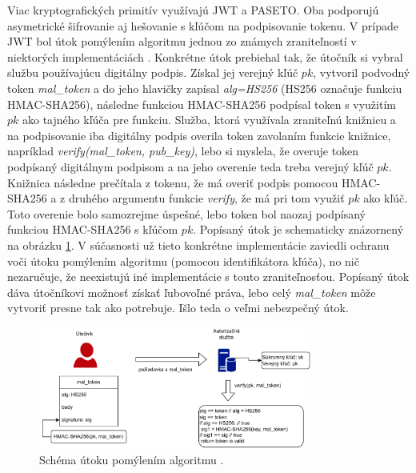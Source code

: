 Viac kryptografických primitív využívajú JWT a PASETO. Oba podporujú asymetrické šifrovanie aj hešovanie s kľúčom na podpisovanie tokenu. V prípade JWT bol útok pomýlením algoritmu jednou zo známych zraniteľností v niektorých implementáciách \cite{jwt_vul}. Konkrétne útok prebiehal tak, že útočník si vybral službu používajúcu digitálny podpis. Získal jej verejný kľúč $pk$, vytvoril podvodný token \textit{mal\_token} a do jeho hlavičky zapísal \textit{alg=HS256} (HS256 označuje funkciu HMAC-SHA256), následne funkciou HMAC-SHA256 podpísal token s využitím $pk$ ako tajného kľúča pre funkciu. Služba, ktorá využívala zraniteľnú knižnicu a na podpisovanie iba digitálny podpis overila token zavolaním funkcie knižnice, napríklad \textit{verify(mal\_token, pub\_key)}, lebo si myslela, že overuje token podpísaný digitálnym podpisom a na jeho overenie teda treba verejný kľúč $pk$. Knižnica následne prečítala z tokenu, že má overiť podpis pomocou HMAC-SHA256 a z druhého argumentu funkcie \textit{verify}, že má pri tom využiť $pk$ ako kľúč. Toto overenie bolo samozrejme úspešné, lebo token bol naozaj podpísaný funkciou HMAC-SHA256 s kľúčom $pk$. Popísaný útok je schematicky znázornený na obrázku \ref{fig:conf_alg_attack}. V súčasnosti už tieto konkrétne implementácie zaviedli ochranu voči útoku pomýlením algoritmu (pomocou identifikátora kľúča), no nič nezaručuje, že neexistujú iné implementácie s touto zraniteľnosťou. Popísaný útok dáva útočníkovi možnosť získať ľubovoľné práva, lebo celý \textit{mal\_token} môže vytvoriť presne tak ako potrebuje. Išlo teda o veľmi nebezpečný útok.

\begin{figure}
  \centerline{\includegraphics[width=0.8\textwidth]{images/conf_alg_attack}}
  \caption[Útok pomýlením algortimu]{Schéma útoku pomýlením algoritmu \cite{jwt_vul}.}
  \label{fig:conf_alg_attack}
\end{figure}

